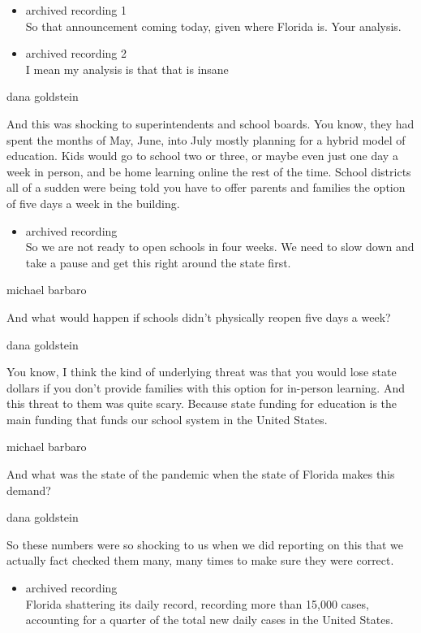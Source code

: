 \begin{itemize}
\item
  archived recording 1\\
  So that announcement coming today, given where Florida is. Your
  analysis.
\item
  archived recording 2\\
  I mean my analysis is that that is insane
\end{itemize}

dana goldstein

And this was shocking to superintendents and school boards. You know,
they had spent the months of May, June, into July mostly planning for a
hybrid model of education. Kids would go to school two or three, or
maybe even just one day a week in person, and be home learning online
the rest of the time. School districts all of a sudden were being told
you have to offer parents and families the option of five days a week in
the building.

\begin{itemize}
\tightlist
\item
  archived recording\\
  So we are not ready to open schools in four weeks. We need to slow
  down and take a pause and get this right around the state first.
\end{itemize}

michael barbaro

And what would happen if schools didn't physically reopen five days a
week?

dana goldstein

You know, I think the kind of underlying threat was that you would lose
state dollars if you don't provide families with this option for
in-person learning. And this threat to them was quite scary. Because
state funding for education is the main funding that funds our school
system in the United States.

michael barbaro

And what was the state of the pandemic when the state of Florida makes
this demand?

dana goldstein

So these numbers were so shocking to us when we did reporting on this
that we actually fact checked them many, many times to make sure they
were correct.

\begin{itemize}
\tightlist
\item
  archived recording\\
  Florida shattering its daily record, recording more than 15,000 cases,
  accounting for a quarter of the total new daily cases in the United
  States.
\end{itemize}

